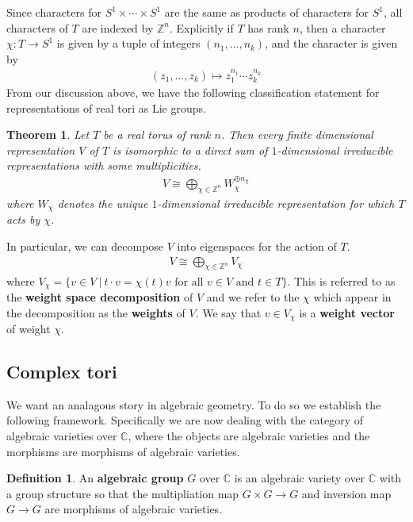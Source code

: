 \documentclass{amsart}
\newcommand{\st}{\ \vert \ }
\newcommand{\C}{\mathbb{C}}
\newcommand{\Z}{\mathbb{Z}}
\newcommand{\set}[1]{\{#1\}}
\numberwithin{equation}{section}
\theoremstyle{plain} %
\newtheorem{theorem}[equation]{Theorem}
\theoremstyle{definition}
\newtheorem{definition}[equation]{Definition}
\theoremstyle{remark}
\begin{document}
Since characters for $S^1\times\cdots\times S^1$ are the same as products of characters for $S^1$,
all characters of $T$ are indexed by $\Z^n$. Explicitly if $T$ has rank $n$, then a character $\chi: T\to S^1$ is given by a tuple of integers $(n_1,\ldots, n_k)$, and the character is given by
\begin{align*}
	(z_1,\ldots, z_k)\mapsto z_1^{n_1}\cdots z_k^{n_k}
\end{align*}
From our discussion above, we have the following classification statement for representations of real tori as Lie groups.

\begin{theorem}
	Let $T$ be a real torus of rank $n$. Then every finite dimensional representation $V$ of $T$ is isomorphic
	to a direct sum of $1$-dimensional irreducible representations with some multiplicities.
	\begin{align*}
		V \cong \bigoplus_{\chi\in \Z^n} W_\chi^{\oplus n_\chi}
	\end{align*} where $W_\chi$ denotes the unique $1$-dimensional irreducible representation for which $T$ acts by $\chi$.
\end{theorem}

In particular, we can decompose $V$ into eigenspaces for the action of $T$. \begin{align*}
	V \cong \bigoplus_{\chi\in\Z^n} V_\chi
\end{align*} where $V_\chi = \set{v\in V \st t\cdot v = \chi(t)v \text{ for all $v\in V$ and $t\in T$}}$. This is
referred to as the \textbf{weight space decomposition} of $V$ and we refer to the $\chi$ which appear in
the decomposition as the \textbf{weights} of $V$.
We say that $v\in V_\chi$ is a \textbf{weight vector} of weight $\chi$.


\subsection{Complex tori}
We want an analagous story in algebraic geometry. To do so we establish the following framework.
Specifically we are now dealing with the category of algebraic varieties over $\C$, where the objects are algebraic varieties
and the morphisms are morphisms of algebraic varieties. 
\begin{definition}
	An \textbf{algebraic group} $G$ over $\C$ is an algebraic variety over $\C$ with a group structure
	so that the multipliation map $G\times G\to G$ and inversion map $G\to G$ are morphisms
	of algebraic varieties.
\end{definition}
\end{document}
